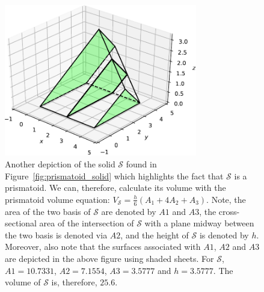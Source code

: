 \documentclass{article}
\theoremstyle{theorem}
\theoremstyle{definition}
\begin{document}
\begin{figure}[htb]
\centering
\includegraphics[width=0.75\textwidth]{prismatoid.pdf}
\caption{Another depiction of the solid $\mathcal{S}$ found in Figure~\ref{fig:prismatoid_solid} which highlights the fact that $\mathcal{S}$ is a prismatoid. We can, therefore, calculate its volume with the prismatoid volume equation: $V_{\mathcal{S}}= \frac{h}{6}(A_1+4A_2+A_3)$.
Note, the area of the two basis of $\mathcal{S}$ are denoted by $A1$ and $A3$, the cross-sectional area of the intersection of $\mathcal{S}$ with a plane midway between the two basis is denoted via $A2$, 
and the height of $\mathcal{S}$ is denoted by $h$. Moreover, also note that the surfaces associated with $A1$, $A2$ and $A3$ are depicted in the above figure using shaded sheets. For $\mathcal{S}$, 
$A1=10.7331$, $A2= 7.1554$, $A3 = 3.5777$ and $h = 3.5777$. The volume of $\mathcal{S}$ is, therefore, $25.6$.}
\label{fig:prismatoid}
\end{figure}
\end{document}

